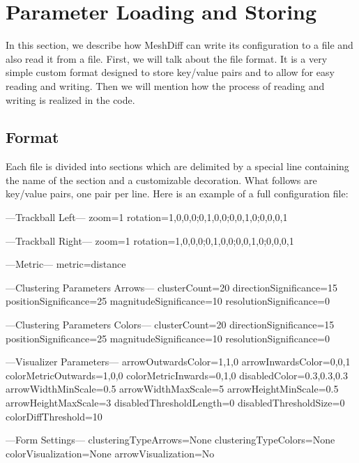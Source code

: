 \section{Parameter Loading and Storing}
\label{attch:parameter_load_store}

In this section, we describe how MeshDiff can write its configuration to a file and also read it from a file. First, we will talk about the file format. It is a very simple custom format designed to store key/value pairs and to allow for easy reading and writing. Then we will mention how the process of reading and writing is realized in the code.

\subsection{Format}
\label{attch:parameter_load_store-format}

Each file is divided into sections which are delimited by a special line containing the name of the section and a customizable decoration. What follows are key/value pairs, one pair per line. Here is an example of a full configuration file:

\begin{code}
---Trackball Left---
zoom=1
rotation=1,0,0,0;0,1,0,0;0,0,1,0;0,0,0,1

---Trackball Right---
zoom=1
rotation=1,0,0,0;0,1,0,0;0,0,1,0;0,0,0,1

---Metric---
metric=distance

---Clustering Parameters Arrows---
clusterCount=20
directionSignificance=15
positionSignificance=25
magnitudeSignificance=10
resolutionSignificance=0

---Clustering Parameters Colors---
clusterCount=20
directionSignificance=15
positionSignificance=25
magnitudeSignificance=10
resolutionSignificance=0

---Visualizer Parameters---
arrowOutwardsColor=1,1,0
arrowInwardsColor=0,0,1
colorMetricOutwards=1,0,0
colorMetricInwards=0,1,0
disabledColor=0.3,0.3,0.3
arrowWidthMinScale=0.5
arrowWidthMaxScale=5
arrowHeightMinScale=0.5
arrowHeightMaxScale=3
disabledThresholdLength=0
disabledThresholdSize=0
colorDiffThreshold=10

---Form Settings---
clusteringTypeArrows=None
clusteringTypeColors=None
colorVisualization=None
arrowVisualization=No
\end{code}

